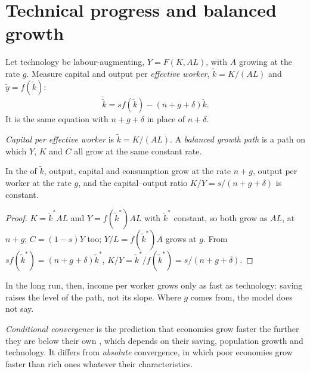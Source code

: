 \section{Technical progress and balanced growth}\label{sec:b1:solow-model:progress}

Let technology be labour-augmenting, $Y = F(K, AL)$, with $A$ growing at the rate
$g$. Measure capital and output per \emph{effective worker}, $\tilde k = K/(AL)$
and $\tilde y = f(\tilde k)$:
\[
\dot{\tilde k} = sf(\tilde k) - (n + g + \delta)\tilde k.
\]
It is the same equation with $n + g + \delta$ in place of $n + \delta$.

\begin{definition}\label{def:b1:solow-model:balanced}
\emph{Capital per effective worker} is $\tilde k = K/(AL)$. A \emph{balanced growth
path} is a path on which $Y$, $K$ and $C$ all grow at the same constant rate.
\end{definition}

\begin{proposition}\label{prop:b1:solow-model:balanced}
In the  of $\tilde k$, output, capital and consumption grow at the
rate $n + g$, output per worker at the rate $g$, and the capital--output ratio
$K/Y = s/(n + g + \delta)$ is constant.
\end{proposition}

\begin{proof}
$K = \tilde k^* AL$ and $Y = f(\tilde k^*)AL$ with $\tilde k^*$ constant, so both grow as $AL$, at
$n + g$; $C = (1 - s)Y$ too; $Y/L = f(\tilde k^*)A$ grows at $g$. From
$sf(\tilde k^*) = (n + g + \delta)\tilde k^*$, $K/Y = \tilde k^*/f(\tilde k^*) = s/(n + g + \delta)$.
\end{proof}

In the long run, then, income per worker grows only as fast as technology:
saving raises the level of the path, not its slope. Where $g$ comes from,
the model does not say.

\begin{definition}\label{def:b1:solow-model:conditional-convergence}
\emph{Conditional convergence} is the prediction that economies grow faster
the further they are below their own , which depends on their
saving, population growth and technology. It differs from \emph{absolute}
convergence, in which poor economies grow faster than rich ones whatever
their characteristics.
\end{definition}

